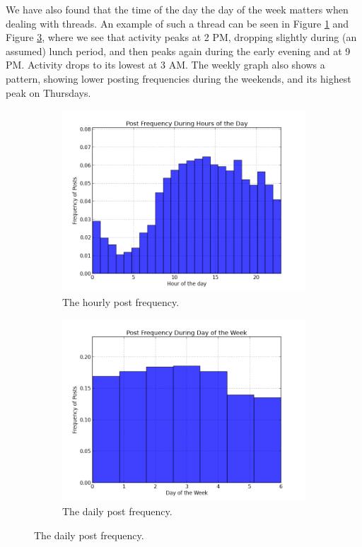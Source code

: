 We have also found that the time of the day the day of the week matters when 
dealing with threads. An example of such a thread can be seen in Figure 
\ref{fig:hr_freq} and Figure \ref{fig:week_freq}, where we see that activity 
peaks at 2 PM, dropping slightly during (an assumed) lunch period, and then 
peaks again during the early evening and at 9 PM.  Activity drops to its lowest 
at 3 AM. The weekly graph also shows a pattern, showing lower posting 
frequencies during the weekends, and its highest peak on Thursdays.
\begin{figure}
\begin{center}
\begin{subfigure}[b]{0.45\textwidth}
\includegraphics[width=\textwidth]{diagrams/hoursofday.png}
\caption{The hourly post frequency.}
\label{fig:hr_freq}
	\end{subfigure}
	\begin{subfigure}[b]{0.45\textwidth}
\includegraphics[width=\textwidth]{diagrams/daysofweek.png}
\caption{The daily post frequency.}
\label{fig:week_freq}
	\end{subfigure}
\end{center}
\end{figure}




